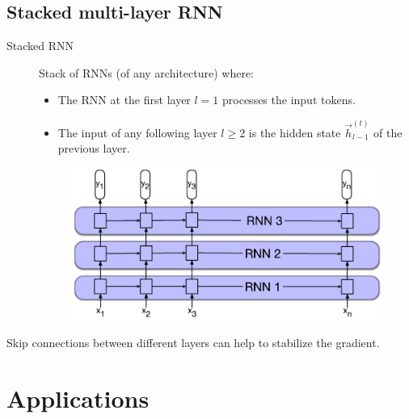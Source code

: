 \subsection{Stacked multi-layer RNN}

\begin{description}
    \item[Stacked RNN] 
        Stack of RNNs (of any architecture) where:
        \begin{itemize}
            \item The RNN at the first layer $l=1$ processes the input tokens.
            \item The input of any following layer $l \geq 2$ is the hidden state $\vec{h}^{(t)}_{l-1}$ of the previous layer.
        \end{itemize}

        \begin{figure}[H]
            \centering
            \includegraphics[width=0.45\linewidth]{./img/_layered_rnn.pdf}
        \end{figure}
\end{description}

\begin{remark}
    Skip connections between different layers can help to stabilize the gradient.
\end{remark}



\section{Applications}

